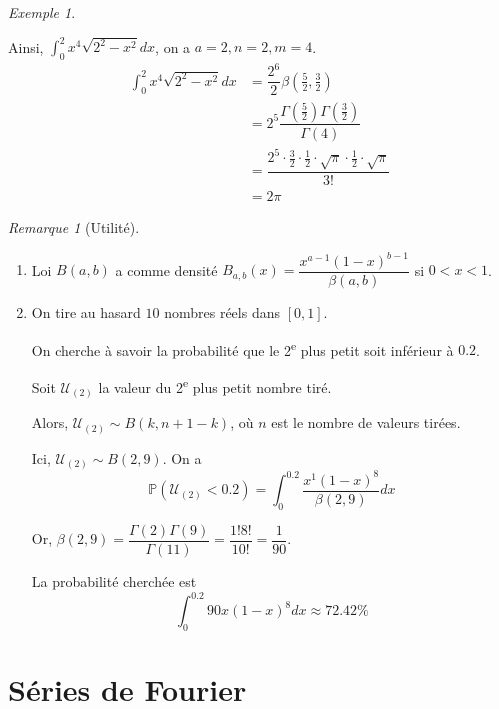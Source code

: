 \documentclass{report}
\newcommand*{\dint}[3]{\displaystyle\int_{#1}^{#2}#3}
\theoremstyle{definition}
\theoremstyle{remark}
\newtheorem*{exem}{Exemple}
\newtheorem*{rema}{Remarque}
\begin{document}
\begin{exem}
\begin{enumerate}[label=\alph*)]
			Ainsi, $\dint{0}{2}{x^4 \sqrt{2^2-x^2} dx}$, on a $a=2, n=2, m=4$.
			\begin{align*}
				\dint{0}{2}{x^4 \sqrt{2^2-x^2} dx}&= \dfrac{2^6}{2} \beta\left( \frac{5}{2}, \frac{3}{2} \right)\\
				&= 2^5 \dfrac{\Gamma\left( \frac{5}{2} \right) \Gamma\left( \frac{3}{2} \right)}{\Gamma(4)}\\
				&= \dfrac{2^5 \cdot \frac{3}{2} \cdot \frac{1}{2} \cdot \sqrt{\pi} \cdot \frac{1}{2} \cdot \sqrt{\pi}}{3!}\\
				&= 2\pi
			\end{align*}
		\end{enumerate}
	\end{exem}
	\begin{rema}[Utilit\'e]~

		\begin{enumerate}[label=\alph*)]
			\item Loi $B(a,b)$ a comme densit\'e $B_{a,b}(x) = \dfrac{x^{a-1}(1-x)^{b-1}}{\beta(a,b)}$ si $0<x<1$.
			\item On tire au hasard $10$ nombres r\'eels dans $[0,1]$.

			On cherche \`a savoir la probabilit\'e que le 2\textsuperscript{e} plus petit soit inf\'erieur \`a $0.2$.

			Soit $\mathcal{U}_{(2)}$ la valeur du 2\textsuperscript{e} plus petit nombre tir\'e.

			Alors, $\mathcal{U}_{(2)} \sim B(k, n+1-k)$, o\`u $n$ est le nombre de valeurs tir\'ees.

			Ici, $\mathcal{U}_{(2)} \sim B(2,9)$. On a
			\begin{equation*}
				\mathbb{P}(\mathcal{U}_{(2)} < 0.2) = \dint{0}{0.2}{\dfrac{x^1(1-x)^8}{\beta(2,9)} dx}
			\end{equation*}

			Or, $\beta(2,9) = \dfrac{\Gamma(2) \Gamma(9)}{\Gamma(11)} = \dfrac{1!8!}{10!} = \dfrac{1}{90}$.

			La probabilit\'e cherch\'ee est
			\begin{equation*}
				\dint{0}{0.2}{90x(1-x)^8 dx} \approx 72.42\%
			\end{equation*}
		\end{enumerate}
	\end{rema}

	\chapter{S\'eries de Fourier}
\end{document}
